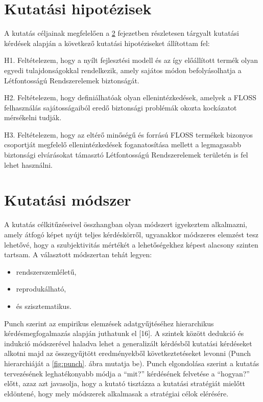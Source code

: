 \documentclass[12pt,magyar,a4paper,oneside]{scrreprt}
\providecommand{\tightlist}{%
  \setlength{\itemsep}{0pt}\setlength{\parskip}{0pt}}
\begin{document}
\hypertarget{kutatuxe1si-hipotuxe9zisek}{%
\section{Kutatási hipotézisek}\label{kutatuxe1si-hipotuxe9zisek}}

A kutatás céljainak megfelelően a \ref{sec:ResearchMethod} fejezetben
részletesen tárgyalt kutatási kérdések alapján a következő kutatási
hipotéziseket állítottam fel:

H1. Feltételezem, hogy a nyílt fejlesztési modell és az így előállított
termék olyan egyedi tulajdonságokkal rendelkezik, amely sajátos módon
befolyásolhatja a Létfontosságú Rendszerelemek biztonságát.

H2. Feltételezem, hogy definiálhatóak olyan ellenintézkedések, amelyek a
FLOSS felhasználás sajátosságaiból eredő biztonsági problémák okozta
kockázatot mérsékelni tudják.

H3. Feltételezem, hogy az eltérő minőségű és forrású FLOSS termékek
bizonyos csoportját megfelelő ellenintézkedések foganatosítása mellett a
legmagasabb biztonsági elvárásokat támasztó Létfontosságú Rendszerelemek
területén is fel lehet használni.

\hypertarget{sec:ResearchMethod}{%
\section{Kutatási módszer}\label{sec:ResearchMethod}}

A kutatás célkitűzéseivel összhangban olyan módszert igyekeztem
alkalmazni, amely átfogó képet nyújt teljes kérdéskörről, ugyanakkor
módszeres elemzést tesz lehetővé, hogy a szubjektivitás mértékét a
lehetőségekhez képest alacsony szinten tartsam. A választott módszertan
tehát legyen:

\begin{itemize}
\tightlist
\item
  rendszerszemléletű,
\item
  reprodukálható,
\item
  és szisztematikus.
\end{itemize}

Punch szerint az empirikus elemzések adatgyűjtéséhez hierarchikus
kérdésmegfogalmazás alapján juthatunk el {[}16{]}. A szintek között
dedukció és indukció módszerével haladva lehet a generalizált kérdésből
kutatási kérdéseket alkotni majd az összegyűjtött eredményekből
következtetéseket levonni (Punch hierarchiáját a \ref{fig:punch}. ábra
mutatja be). Punch elgondolása szerint a kutatás tervezésének
leghatékonyabb módja a ``mit?'' kérdésének felvetése a ``hogyan?''
előtt, azaz azt javasolja, hogy a kutató tisztázza a kutatási stratégiát
mielőtt eldöntené, hogy mely módszerek alkalmasak a stratégiai célok
elérésére.
\end{document}
